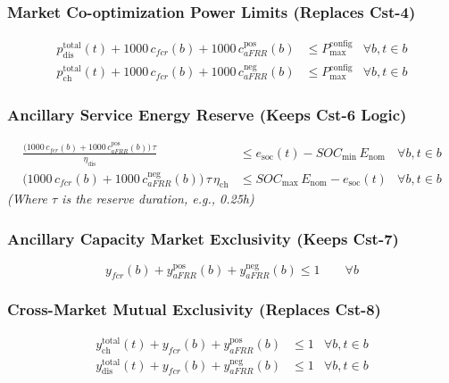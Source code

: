 \documentclass[11pt, a4paper]{article}
\begin{document}
\subsubsection{Market Co-optimization Power Limits (Replaces Cst-4)}
\begin{align}
p^{\mathrm{total}}_{\mathrm{dis}}(t) + 1000\,c_{fcr}(b) + 1000\,c^{\mathrm{pos}}_{aFRR}(b) &\le P^{\mathrm{config}}_{\max} & \forall b, t \in b \\
p^{\mathrm{total}}_{\mathrm{ch}}(t) + 1000\,c_{fcr}(b) + 1000\,c^{\mathrm{neg}}_{aFRR}(b) &\le P^{\mathrm{config}}_{\max} & \forall b, t \in b
\end{align}

\subsubsection{Ancillary Service Energy Reserve (Keeps Cst-6 Logic)}
\begin{align}
    \frac{\big(1000\,c_{fcr}(b) + 1000\,c^{\mathrm{pos}}_{aFRR}(b)\big)\,\tau}{\eta_{\mathrm{dis}}} &\leq e_{\mathrm{soc}}(t) - SOC_{\min}\,E_{\mathrm{nom}} & \forall b, t \in b \\
    \big(1000\,c_{fcr}(b) + 1000\,c^{\mathrm{neg}}_{aFRR}(b)\big)\,\tau\,\eta_{\mathrm{ch}} &\leq SOC_{\max}\,E_{\mathrm{nom}} - e_{\mathrm{soc}}(t) & \forall b, t \in b
\end{align}
\textit{(Where $\tau$ is the reserve duration, e.g., 0.25h)}

\subsubsection{Ancillary Capacity Market Exclusivity (Keeps Cst-7)}
\begin{equation}
    y_{fcr}(b) + y^{\mathrm{pos}}_{aFRR}(b) + y^{\mathrm{neg}}_{aFRR}(b) \le 1 \qquad \forall b
\end{equation}

\subsubsection{Cross-Market Mutual Exclusivity (Replaces Cst-8)}
\begin{align}
    y^{\mathrm{total}}_{\mathrm{ch}}(t) + y_{fcr}(b) + y^{\mathrm{pos}}_{aFRR}(b) &\le 1 & \forall b, t \in b \\
    y^{\mathrm{total}}_{\mathrm{dis}}(t) + y_{fcr}(b) + y^{\mathrm{neg}}_{aFRR}(b) &\le 1 & \forall b, t \in b
\end{align}
\end{document}
